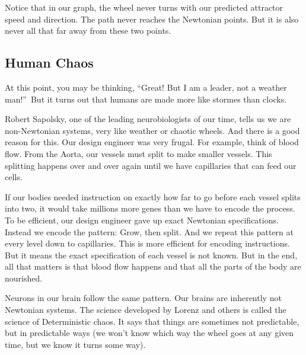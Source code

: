 \documentclass{article}
\begin{document}
Notice that in our graph, the wheel never turns with our predicted attractor
speed and direction. The path never reaches the Newtonian points. But it is
also never all that far away from these two points.

\subsection{Human Chaos}

At this point, you may be thinking, \textquotedblleft Great! But I am a
leader, not a weather man!\textquotedblright\ But it turns out that humans
are made more like stormes than clocks.\cite{Sapolsky}

Robert Sapolsky, one of the leading neurobiologists of our time, tells us we
are non-Newtonian systems, very like weather or chaotic wheels. And there is
a good reason for this. Our design engineer was very frugal. For example,
think of blood flow. From the Aorta, our vessels must split to make smaller
vessels. This splitting happens over and over again until we have
capillaries that can feed our cells.

If our bodies needed instruction on exactly how far to go before each vessel
splits into two, it would take millions more genes than we have to encode
the process. To be efficient, our design engineer gave up exact Newtonian
specifications. Instead we encode the pattern: Grow, then split. And we
repeat this pattern at every level down to capillaries. This is more
efficient for encoding instructions. But it means the exact specification of
each vessel is not known. But in the end, all that matters is that blood
flow happens and that all the parts of the body are nourished.\cite{Sapolsky}

Neurons in our brain follow the same pattern. Our brains are inherently not
Newtonian systems. The science developed by Lorenz and others is called the
science of Deterministic chaos. It says that things are sometimes not
predictable, but in predictable ways (we won't know which way the wheel goes
at any given time, but we know it turns some way).
\end{document}
